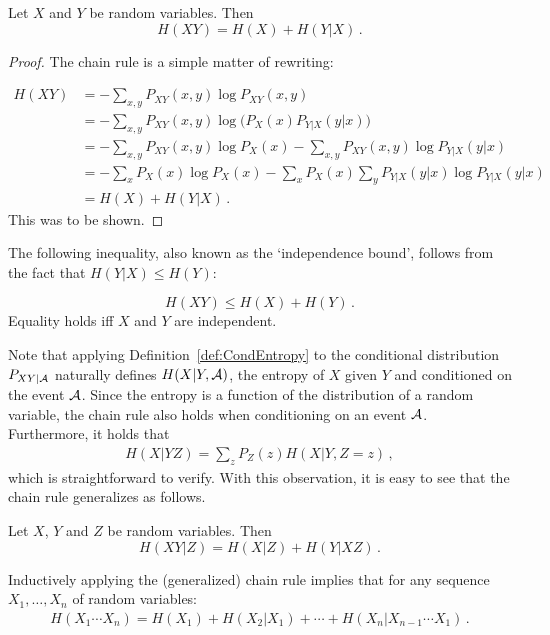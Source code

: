\begin{proposition} 
Let $X$ and $Y$ be random variables. Then
\[
H(XY)= H(X) + H(Y|X) \, .
\]
\end{proposition}

\begin{proof}
The chain rule is a simple matter of rewriting:

\begin{align}
H(XY) &= -\sum_{x,y} P_{XY}(x,y)\log P_{XY}(x,y) \nonumber \\
&= -\sum_{x,y} P_{XY}(x,y)\log\bigl(P_X(x)P_{Y|X}(y|x)\bigr) \nonumber \\
&= -\sum_{x,y} P_{XY}(x,y) \log P_X(x)  -\sum_{x,y}
P_{XY}(x,y) \log P_{Y|X}(y|x) \nonumber \\
&=  -\sum_{x}P_X(x)\log P_X(x) - \sum_{x} P_X(x)\sum_{y} P_{Y|X}(y|x) \log
P_{Y|X}(y|x) \nonumber \\
&= H(X) + H(Y|X) \, .
\end{align}
This was to be shown. 
\end{proof}
The following inequality, also known as the `independence bound', follows from the fact that $H(Y|X)\leq H(Y)$:
\begin{corollary}[Subadditivity]
\[
H(XY)\leq H(X)+H(Y) \, .
\]
Equality holds iff $X$ and $Y$ are independent.
\end{corollary}

Note that applying Definition~\ref{def:CondEntropy} to the conditional distribution $P_{XY|\cal A}$ naturally defines $H(X|Y,{\cal A})$, the entropy of $X$ given $Y$ and conditioned on the event $\cal A$. 
Since the entropy is a function of the distribution of a random variable, the chain rule also holds when conditioning on an event ${\cal A}$. Furthermore, it holds that
\begin{align}
H(X|YZ) = \sum_z P_Z(z) H(X|Y,Z\!=\!z) \, ,
\end{align}
which is straightforward to verify. With this observation, it is easy to see that the chain rule generalizes as follows. 

\begin{corollary}
Let $X$, $Y$ and $Z$ be random variables. Then
\[
H(XY|Z) = H(X|Z) + H(Y|XZ) \, .
\]
\end{corollary}%
Inductively applying the (generalized) chain rule implies that for any sequence $X_1,\ldots,X_n$ of random variables: 
\begin{align}
H(X_1\cdots X_n)= H(X_1) + H(X_2|X_1) + \cdots + H(X_n|X_{n-1}\cdots
X_1) \, .
\end{align}

